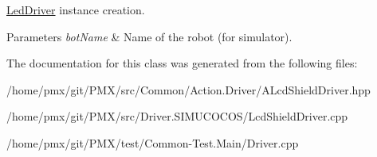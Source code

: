 \hyperlink{classLedDriver}{Led\+Driver} instance creation. 


\begin{DoxyParams}{Parameters}
{\em bot\+Name} & Name of the robot (for simulator). \\
\hline
\end{DoxyParams}


The documentation for this class was generated from the following files\+:\begin{DoxyCompactItemize}
\item 
/home/pmx/git/\+P\+M\+X/src/\+Common/\+Action.\+Driver/A\+Lcd\+Shield\+Driver.\+hpp\item 
/home/pmx/git/\+P\+M\+X/src/\+Driver.\+S\+I\+M\+U\+C\+O\+C\+O\+S/Lcd\+Shield\+Driver.\+cpp\item 
/home/pmx/git/\+P\+M\+X/test/\+Common-\/\+Test.\+Main/Driver.\+cpp\end{DoxyCompactItemize}
